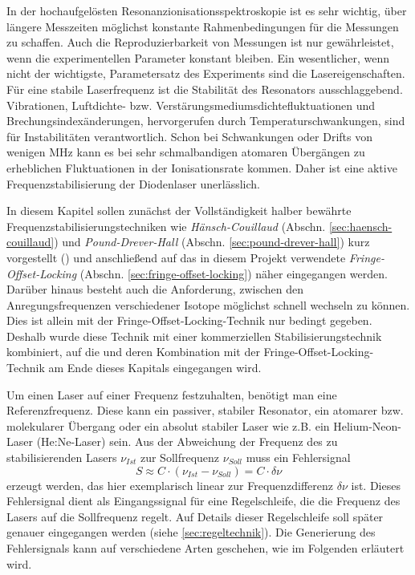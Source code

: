 In der hochaufgelösten Resonanzionisationsspektroskopie ist es
sehr wichtig, über längere Messzeiten möglichst konstante Rahmenbedingungen für
die Messungen zu schaffen. Auch die Reproduzierbarkeit von Messungen ist nur
gewährleistet, wenn die experimentellen Parameter konstant bleiben. Ein
wesentlicher, wenn nicht der wichtigste, Parametersatz des Experiments sind die Lasereigenschaften. Für
eine stabile Laserfrequenz ist die Stabilität des Resonators ausschlaggebend.
Vibrationen, Luftdichte- bzw. Verstärungsmediumsdichtefluktuationen und
Brechungsindexänderungen, hervorgerufen durch Temperaturschwankungen, sind für
Instabilitäten verantwortlich. Schon bei Schwankungen oder Drifts von wenigen
MHz kann es bei sehr schmalbandigen atomaren Übergängen zu erheblichen
Fluktuationen in der Ionisationsrate kommen. Daher ist eine aktive
Frequenzstabilisierung der Diodenlaser unerlässlich.\par
In diesem Kapitel sollen zunächst der Vollständigkeit halber bewährte
Frequenzstabilisierungstechniken wie
\textit{Hänsch-Couillaud} (Abschn.
\ref{sec:haensch-couillaud}) und \textit{Pound-Drever-Hall} (Abschn.
\ref{sec:pound-drever-hall}) kurz vorgestellt
(\cite{noertershaeuser:physik_des_lasers}) und anschließend auf das
in diesem Projekt verwendete \textit{Fringe-Offset-Locking} (Abschn.
\ref{sec:fringe-offset-locking}) näher eingegangen werden. Darüber hinaus
besteht auch die Anforderung, zwischen den Anregungsfrequenzen verschiedener
Isotope möglichst schnell wechseln zu können. Dies ist allein mit der
Fringe-Offset-Locking-Technik nur bedingt gegeben. Deshalb wurde diese Technik
mit einer kommerziellen Stabilisierungstechnik kombiniert, auf die und deren Kombination
mit der Fringe-Offset-Locking-Technik am Ende dieses Kapitals eingegangen
wird.\par
Um einen Laser auf einer Frequenz festzuhalten, benötigt
man eine Referenzfrequenz. Diese kann ein passiver, stabiler Resonator, ein
atomarer bzw. molekularer Übergang oder ein absolut stabiler Laser wie z.B. ein
Helium-Neon-Laser (He:Ne-Laser) sein.
Aus der Abweichung der Frequenz des zu stabilisierenden Lasers $\nu_{Ist}$ zur
Sollfrequenz $\nu_{Soll}$ muss ein Fehlersignal
\begin{equation}\label{eq:servoschleife_fehlersignal}
	S\approx C\cdot(\nu_{Ist}-\nu_{Soll})=C\cdot\delta\nu
\end{equation}
erzeugt werden, das hier exemplarisch linear zur Frequenzdifferenz $\delta\nu$
ist. Dieses Fehlersignal dient als Eingangssignal für eine Regelschleife, die
die Frequenz des Lasers auf die Sollfrequenz regelt. Auf Details dieser
Regelschleife soll später genauer eingegangen werden (siehe
\ref{sec:regeltechnik}). Die Generierung des Fehlersignals kann auf verschiedene
Arten geschehen, wie im Folgenden erläutert wird.

